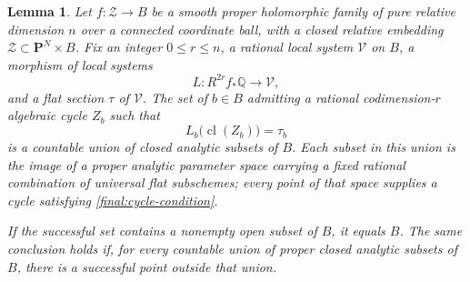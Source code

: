 \documentclass[11pt]{amsart}
\newcommand{\Q}{\mathbb Q}
\newcommand{\PP}{\mathbf P}
\DeclareMathOperator{\cl}{cl}
\newtheorem{lemma}[theorem]{Lemma}
\theoremstyle{definition}
\theoremstyle{remark}
\numberwithin{equation}{section}
\begin{document}
\begin{lemma}\label{final:hilbert}
Let $f:\mathcal Z\to B$ be a smooth proper holomorphic family of pure
relative dimension $n$ over a connected coordinate ball, with a closed
relative embedding $\mathcal Z\subset\PP^N\times B$.  Fix an integer
$0\leq r\leq n$, a rational local system $\mathcal V$ on $B$, a
morphism of local systems
\[
 L:R^{2r}f_*\Q\longrightarrow\mathcal V,
\]
and a flat section $\tau$ of $\mathcal V$.  The set of $b\in B$ admitting
a rational codimension-$r$ algebraic cycle $Z_b$ such that
\begin{equation}\label{final:cycle-condition}
 L_b\bigl(\cl(Z_b)\bigr)=\tau_b
\end{equation}
is a countable union of closed analytic subsets of $B$.  Each subset
in this union is the image of a proper analytic parameter space
carrying a fixed rational combination of universal flat subschemes;
every point of that space supplies a cycle satisfying
\eqref{final:cycle-condition}.

If the successful set contains a nonempty open subset of $B$, it equals
$B$.  The same conclusion holds if, for every countable union of proper
closed analytic subsets of $B$, there is a successful point outside
that union.
\end{lemma}
\end{document}
